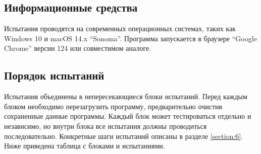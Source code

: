 \documentclass[a4paper, 12pt]{article}
\begin{document}
	\subsection{Информационные средства}
	Испытания проводятся на современных операционных системах, таких как Windows 10 и macOS 14.x \enquote{Sonoma}. Программа
	запускается в браузере \enquote{Google Chrome} версии 124 или совместимом аналоге.

	\subsection{Порядок испытаний}

	Испытания объединены в непересекающиеся блоки испытаний. Перед каждым блоком необходимо перезагрузить программу, предварительно
	очистив сохраненные данные программы. Каждый блок может тестироваться отдельно и независимо, но внутри блока все испытания
	должны проводиться последовательно. Конкретные шаги испытаний описаны в разделе \ref{section:6}. Ниже приведена таблица
	с блоками и испытаниями.
\end{document}
